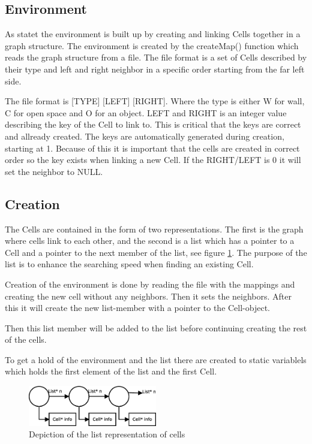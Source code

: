 \subsection{Environment}

As statet the environment is built up by creating and linking Cells together in
a graph structure. The environment is created by the createMap() function which
reads the graph structure from a file.  The file format is a set of Cells
described by their type and left and right neighbor in a specific order starting
from the far left side.

The file format is [TYPE] [LEFT] [RIGHT]. Where the type is either W for wall, C
for open space and O for an object. LEFT and RIGHT is an integer value
describing the key of the Cell to link to.  This is critical that the keys are
correct and allready created.  The keys are automatically generated during
creation, starting at 1.  Because of this it is important that the cells are
created in correct order so the key exists when linking a new Cell.  If the
RIGHT/LEFT is 0 it will set the neighbor to NULL.

\subsection{Creation}
The Cells are contained in the form of two representations.  The first is the
graph where cells link to each other, and the second is a list which has a
pointer to a Cell and a pointer to the next member of the list, see figure
\ref{fig:list}. The purpose of the list is to enhance the searching speed when 
finding an existing Cell.

Creation of the environment is done by reading the file with the mappings and
creating the new cell without any neighbors. Then it sets the neighbors. After
this it will create the new list-member with a pointer to the Cell-object.

Then this list member will be added to the list before continuing creating the
rest of the cells.

To get a hold of the environment and the list there are created to static
variablels which holds the first element of the list and the first Cell.

\begin{figure}[h] \label{fig:list}	\centering
\includegraphics[width=0.5\textwidth]{list}
\caption{Depiction of the list representation of cells}
\end{figure}

